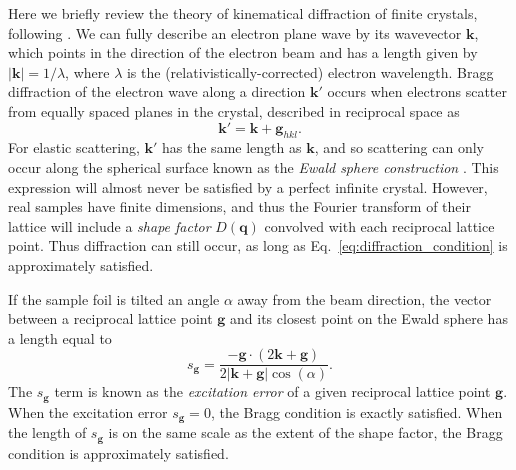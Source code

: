 \documentclass[%
 superscriptaddress,
 aip,
 amsmath,amssymb,
reprint,%
 author-year,%
longbibliography
]{revtex4-2}
\begin{document}
Here we briefly review the theory of kinematical diffraction of finite crystals, following \cite{de2003introduction}. We can fully describe an electron plane wave by its wavevector $\bm{k}$, which points in the direction of the electron beam and has a length given by $|\bm{k}| = 1/\lambda$, where $\lambda$ is the (relativistically-corrected) electron wavelength. Bragg diffraction of the electron wave along a direction $\bm{k}'$ occurs when electrons scatter from equally spaced planes in the crystal, described in reciprocal space as
\begin{equation}
    \bm{k}' = \bm{k} + \bm{g}_{hkl}.
    \label{eq:diffraction_condition}
\end{equation}
For elastic scattering, $\bm{k}'$ has the same length as $\bm{k}$, and so scattering can only occur along the spherical surface known as the \emph{Ewald sphere construction} \citep{ewald1921berechunung}. This expression will almost never be satisfied by a perfect infinite crystal. However, real samples have finite dimensions, and thus the Fourier transform of their lattice will include a \emph{shape factor} $D(\bm{q})$ convolved with each reciprocal lattice point. Thus diffraction can still occur, as long as Eq.~\ref{eq:diffraction_condition} is approximately satisfied.

If the sample foil is tilted an angle $\alpha$ away from the beam direction, the vector between a reciprocal lattice point $\bm{g}$ and its closest point on the Ewald sphere has a length equal to
\begin{equation}
    s_{\bm{g}} = 
    \frac{-\bm{g} \cdot(2 \bm{k} + \bm{g}) }
    {2 | \bm{k} + \bm{g} | \cos(\alpha) }.
    \label{eq:excitation error}
\end{equation}
The $s_{\bm{g}}$ term is known as the \emph{excitation error} of a given reciprocal lattice point $\bm{g}$. When the excitation error $s_{\bm{g}}=0$, the Bragg condition is exactly satisfied. When the length of $s_{\bm{g}}$ is on the same scale as the extent of the shape factor, the Bragg condition is approximately satisfied.
\end{document}
